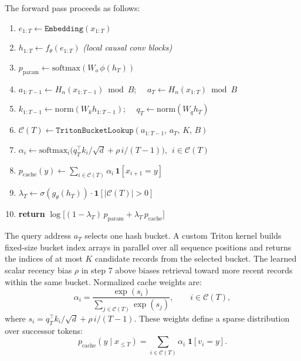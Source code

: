 \documentclass{article}
\begin{document}
\noindent\begin{minipage}{\linewidth}
The forward pass proceeds as follows:
\begin{enumerate}
  \item $e_{1:T} \leftarrow \texttt{Embedding}(x_{1:T})$
  \item $h_{1:T} \leftarrow f_\theta(e_{1:T})$ \hfill\textit{(local causal conv blocks)}
  \item $p_{\mathrm{param}} \leftarrow \mathrm{softmax}(W_o\,\phi(h_T))$
  \item $a_{1:T-1} \leftarrow H_n(x_{1:T-1}) \bmod B$; $\quad a_T \leftarrow H_n(x_{1:T}) \bmod B$
  \item $k_{1:T-1} \leftarrow \mathrm{norm}(W_k h_{1:T-1})$; $\quad q_T \leftarrow \mathrm{norm}(W_q h_T)$
  \item $\mathcal{C}(T) \leftarrow \texttt{TritonBucketLookup}(a_{1:T-1},\,a_T,\,K,\,B)$
  \item $\alpha_i \leftarrow \mathrm{softmax}_i\!\bigl(q_T^\top k_i / {\sqrt{d}} + \rho\,i/(T{-}1)\bigr)$, $\;i\in\mathcal{C}(T)$
  \item $p_{\mathrm{cache}}(y) \leftarrow \sum_{i \in \mathcal{C}(T)} \alpha_i\,\mathbf{1}[x_{i+1}=y]$
  \item $\lambda_T \leftarrow \sigma(g_\theta(h_T))\cdot\mathbf{1}[\lvert\mathcal{C}(T)\rvert>0]$
  \item \textbf{return} $\log\!\bigl[(1-\lambda_T)\,p_{\mathrm{param}} + \lambda_T\,p_{\mathrm{cache}}\bigr]$
\end{enumerate}
\end{minipage}

The query address $a_T$ selects one hash bucket. A custom Triton kernel builds
fixed-size bucket index arrays in parallel over all sequence positions and
returns the indices of at most $K$ candidate records from the selected bucket.
The learned scalar recency bias $\rho$ in step 7 above biases retrieval toward
more recent records within the same bucket. Normalized cache weights are:
\begin{equation}
  \alpha_i =
  \frac{\exp(s_i)}{\sum_{j \in \mathcal{C}(T)} \exp(s_j)},
  \qquad i \in \mathcal{C}(T),
\end{equation}
where $s_i = q_T^\top k_i / \sqrt{d} + \rho\, i/(T-1)$.
These weights define a sparse distribution over successor tokens:
\begin{equation}
  p_{\mathrm{cache}}(y \mid x_{\leq T})
  = \sum_{i \in \mathcal{C}(T)} \alpha_i \;\mathbf{1}[v_i = y].
  \label{eq:cache-dist}
\end{equation}
\end{document}
